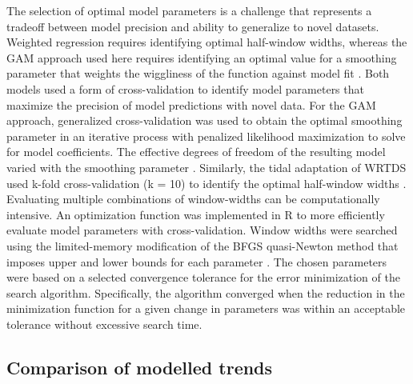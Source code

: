 \documentclass[letterpaper,12pt,oneside]{article}\usepackage[]{graphicx}\usepackage[]{color}
\begin{document}
The selection of optimal model parameters is a challenge that represents a tradeoff between model precision and ability to generalize to novel datasets.  Weighted regression requires identifying optimal half-window widths, whereas the \ac{GAM} approach used here requires identifying an optimal value for a smoothing parameter that weights the wiggliness of the function against model fit \citep{Wood06}.  Both models used a form of cross-validation to identify model parameters that maximize the precision of model predictions with novel data. For the \ac{GAM} approach, generalized cross-validation was used to obtain the optimal smoothing parameter in an iterative process with penalized likelihood maximization to solve for model coefficients. The effective degrees of freedom of the resulting model varied with the smoothing parameter \citep{Wood06}. Similarly, the tidal adaptation of \ac{WRTDS} used k-fold cross-validation (k = 10) to identify the optimal half-window widths \citep{Efron93,Arlot10}. Evaluating multiple combinations of window-widths can be computationally intensive. An optimization function was implemented in R  \citep{RDCT15} to more efficiently evaluate model parameters with cross-validation.  Window widths were searched using the limited-memory modification of the BFGS quasi-Newton method that imposes upper and lower bounds for each parameter \citep{Byrd95,Nocedal06}. The chosen parameters were based on a selected convergence tolerance for the error minimization of the search algorithm.  Specifically, the algorithm converged when the reduction in the minimization function for a given change in parameters was within an acceptable tolerance without excessive search time.  
\subsection*{Comparison of modelled trends}
\end{document}
